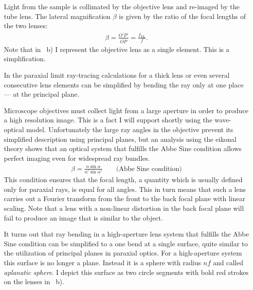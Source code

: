 Light from the sample is collimated by the objective lens and
 re-imaged by the tube lens. The lateral
magnification $\beta$ is given by the ratio of the focal lengths of
the two lenses:
\begin{align}
  \beta=\frac{\overline{O'P'}}{\overline{OP}}=\frac{f_\mathrm{TL}}{f}.
\end{align}
Note that in ~b) I represent the
 objective lens as a single element.  This
is a simplification.

In the paraxial limit ray-tracing calculations for a thick lens or
even several consecutive lens elements can be simplified by bending
the ray only at one place --- at the principal plane.





Microscope objectives must collect light from a large aperture in
order to produce a high resolution image. This is a fact I will
support shortly using the wave-optical model. Unfortunately the large
ray angles in the objective prevent its simplified description using
principal planes, but an analysis using the eikonal theory shows that
an optical system that fulfills the Abbe Sine condition allows perfect
imaging even for widespread ray bundles.
\begin{align}
  \beta = \frac{n \sin\alpha}{n' \sin\alpha'} \qquad \textrm{(Abbe Sine condition)}
\end{align}
This condition ensures that the focal length, a quantity which is
usually defined only for paraxial rays, is equal for all angles.  This
in turn means that such a lens carries out a Fourier transform from
the front to the back focal plane with linear scaling. Note that a
lens with a non-linear distortion in the back focal plane will fail to
produce an image that is similar to the object.

It turns out that ray bending in a high-aperture lens system that
fulfills the Abbe Sine condition can be simplified to a one bend at a
single surface, quite similar to the utilization of principal planes
in paraxial optics. For a high-aperture system this surface is no
longer a plane.  Instead it is a sphere with radius $n f$ and called
\emph{aplanatic sphere}. I depict this surface as two circle segments
with bold red strokes on the lenses in
~b).

